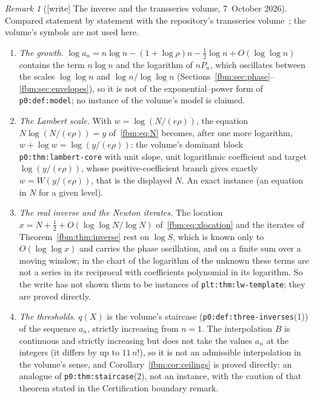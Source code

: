 \documentclass[11pt]{article}
\theoremstyle{remark}\newtheorem{remark}[theorem]{Remark}
\newcommand{\file}[1]{\nolinkurl{#1}}
\begin{document}
\begin{remark}[{[write]} The inverse and the transseries volume, 7~October 2026]\label{fbm:rem:transseries}
Compared statement by statement with the repository's transseries
volume~\cite{TSvol}; the volume's symbols are not used here.
\begin{enumerate}\raggedright
\item \emph{The growth.} $\log a_n=n\log n-(1+\log\rho)n-\frac12\log n+O(\log\log n)$
contains the term $n\log n$ and the logarithm of $nP_n$, which oscillates
between the scales $\log\log n$ and $\log n/\log\log n$
(Sections~\ref{fbm:sec:phase}--\ref{fbm:sec:envelopes}),
so it is not of the exponential--power form of \file{p0:def:model}; no
instance of the volume's model is claimed.
\item \emph{The Lambert scale.} With $w=\log(N/(e\rho))$, the
equation $N\log(N/(e\rho))=y$ of~\eqref{fbm:eq:N} becomes, after one more
logarithm, $w+\log w=\log(y/(e\rho))$: the volume's dominant block
\file{p0:thm:lambert-core} with unit slope, unit logarithmic coefficient and
target $\log(y/(e\rho))$, whose positive-coefficient branch gives exactly
$w=W(y/(e\rho))$, that is the displayed $N$. An exact instance (an equation
in $N$ for a given level).
\item \emph{The real inverse and the Newton iterates.} The location
$x=N+\frac12+O(\log\log N/\log N)$ of~\eqref{fbm:eq:xlocation} and the
iterates of Theorem~\ref{fbm:thm:inverse} rest on $\log S$, which is known
only to $O(\log\log x)$ and carries the phase oscillation, and on a finite sum
over a moving window; in the chart of the logarithm of the unknown these terms
are not a series in its reciprocal with coefficients polynomial in its
logarithm. So the write has not shown them to be instances of
\file{plt:thm:lw-template}; they are proved directly.
\item \emph{The thresholds.} $q(X)$ is the volume's staircase
(\file{p0:def:three-inverses}(1)) of the sequence $a_n$, strictly increasing
from $n=1$. The interpolation $B$ is continuous and strictly increasing but
does not take the values $a_n$ at the integers (it differs by up to $11\,n!$),
so it is not an admissible interpolation in the volume's sense, and
Corollary~\ref{fbm:cor:ceilings} is proved directly: an analogue of
\file{p0:thm:staircase}(2), not an instance, with the caution of that theorem
stated in the Certification boundary remark.
\end{enumerate}
\end{remark}
\end{document}
